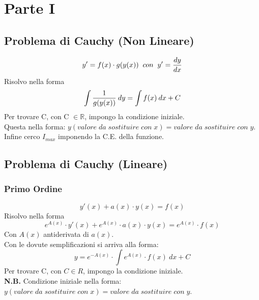 \documentclass[a4paper, 10pt]{article}
\begin{document}
	\begin{frontespizio}
		\Preambolo{\usepackage{datetime}}
	\end{frontespizio}
	
	\tableofcontents
	
	\newpage

	\section{Parte I}
		\subsection{Problema di Cauchy (Non Lineare)}
				\[
					y' = f(x) \cdot g(y(x))  
					\;\;con\;\; 
					y' = {dy \over dx}
				\]
			Risolvo nella forma
				\[
					\int {1 \over g(y(x))}\:dy = \int f(x)\:dx + C
				\]
			Per trovare C, con C $ \in \mathbb{R} $, impongo la condizione iniziale.\\
			Questa nella forma: $ y(valore\;da\;sostituire\;con\;x) = valore\;da\;sostituire\;con\;y $.\\
			Infine cerco $ I_{max} $ imponendo la C.E. della funzione.
			
		\subsection{Problema di Cauchy (Lineare)}
			\subsubsection{Primo Ordine}
					\[
						y'(x) + a(x) \cdot y(x) = f(x)
					\]
				Risolvo nella forma
					\[
						\mathit{e}^{A(x)} \cdot y'(x) + \mathit{e}^{A(x)} \cdot a(x) \cdot y(x) = \mathit{e}^{A(x)} \cdot f(x)
					\]
				Con $ A(x) $ antiderivata di $ a(x) $.\\
				Con le dovute semplificazioni si arriva alla forma:
					\[
						y = \mathit{e}^{-A(x)} \cdot \int \mathit{e}^{A(x)} \cdot f(x)\:dx + C
					\]	
				Per trovare C, con $ C \in R $, impongo la condizione iniziale.\\
				\textbf{N.B.} Condizione iniziale nella forma: $ y(valore\;da\;sostituire\;con\;x) = valore\;da\;sostituire\;con\;y $.
				
\end{document}
